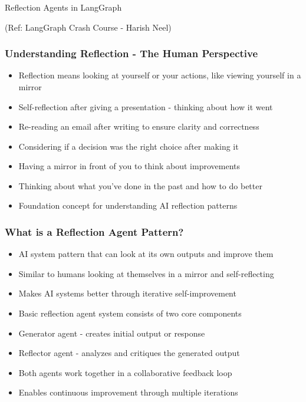 \begin{frame}[fragile]\frametitle{}
\begin{center}
{\Large Reflection Agents in LangGraph}

{\tiny (Ref: LangGraph Crash Course - Harish Neel)}

\end{center}
\end{frame}

\begin{frame}[fragile]\frametitle{Understanding Reflection - The Human Perspective}
      \begin{itemize}
        \item Reflection means looking at yourself or your actions, like viewing yourself in a mirror
        \item Self-reflection after giving a presentation - thinking about how it went
        \item Re-reading an email after writing to ensure clarity and correctness
        \item Considering if a decision was the right choice after making it
        \item Having a mirror in front of you to think about improvements
        \item Thinking about what you've done in the past and how to do better
        \item Foundation concept for understanding AI reflection patterns
      \end{itemize}
\end{frame}

\begin{frame}[fragile]\frametitle{What is a Reflection Agent Pattern?}
      \begin{itemize}
        \item AI system pattern that can look at its own outputs and improve them
        \item Similar to humans looking at themselves in a mirror and self-reflecting
        \item Makes AI systems better through iterative self-improvement
        \item Basic reflection agent system consists of two core components
        \item Generator agent - creates initial output or response
        \item Reflector agent - analyzes and critiques the generated output
        \item Both agents work together in a collaborative feedback loop
        \item Enables continuous improvement through multiple iterations
      \end{itemize}
\end{frame}

